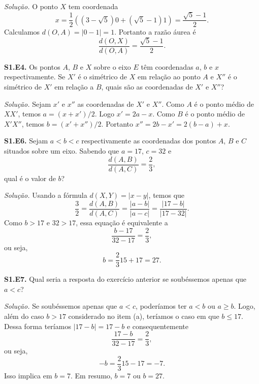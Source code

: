 \documentclass[a4paper,11pt]{article}
\begin{document}
\vspace{\baselineskip}

\emph{Solução.}
O ponto $X$ tem coordenada
\[
  x = \frac{1}{2} ( (3-\sqrt{5}) 0 + (\sqrt{5}-1) 1 ) = \frac{\sqrt{5}-1}{2}.
\]
Calculamos $d(O,A) = |0-1| = 1$.
Portanto a razão áurea é
\[
  \frac{d(O,X)}{d(O,A)} = \frac{\sqrt{5}-1}{2}.
\]

\vspace{\baselineskip}

\textbf{S1.E4.}
Os pontos $A$, $B$ e $X$ sobre o eixo $E$ têm coordenadas $a$, $b$ e $x$ respectivamente.
Se $X'$ é o simétrico de $X$ em relação ao ponto $A$ e $X''$ é o simétrico de $X'$ em relação a $B$, quais são as coordenadas de $X'$ e $X''$?

\vspace{\baselineskip}

\emph{Solução.}
Sejam $x'$ e $x''$ as coordenadas de $X'$ e $X''$.
Como $A$ é o ponto médio de $XX'$, temos $a = (x+x')/2$.
Logo $x' = 2a - x$.
Como $B$ é o ponto médio de $X'X''$, temos $b = (x'+x'')/2$.
Portanto $x'' = 2b - x' = 2(b-a) + x$.

\vspace{\baselineskip}

\textbf{S1.E6.}
Sejam $a < b < c$ respectivamente as coordenadas dos pontos $A$, $B$ e $C$ situados sobre um eixo.
Sabendo que $a = 17$, $c = 32$ e
\[
  \frac{d(A,B)}{d(A,C)} = \frac{2}{3},
\]
qual é o valor de $b$?

\vspace{\baselineskip}

\emph{Solução.}
Usando a fórmula $d(X,Y) = |x-y|$, temos que
\[
  \frac{3}{2} = \frac{d(A,B)}{d(A,C)} = \frac{|a-b|}{|a-c|} = \frac{|17-b|}{|17-32|}.
\]
Como $b > 17$ e $32 > 17$, essa equação é equivalente a
\[
  \frac{b-17}{32-17} = \frac{2}{3},
\]
ou seja,
\[
  b = \frac{2}{3} 15 + 17 = 27.
\]

\vspace{\baselineskip}

\textbf{S1.E7.}
Qual seria a resposta do exercício anterior se soubéssemos apenas que $a < c$?

\vspace{\baselineskip}

\emph{Solução.}
Se soubéssemos apenas que $a < c$, poderíamos ter $a < b$ ou $a \ge b$.
Logo, além do caso $b > 17$ considerado no item (a), teríamos o caso em que $b \le 17$.
Dessa forma teríamos $|17-b| = 17-b$ e consequentemente
\[
  \frac{17-b}{32-17} = \frac{2}{3},
\]
ou seja,
\[
  -b = \frac{2}{3} 15 - 17 = -7.
\]
Isso implica em $b = 7$.
Em resumo, $b = 7$ ou $b = 27$.
\end{document}
